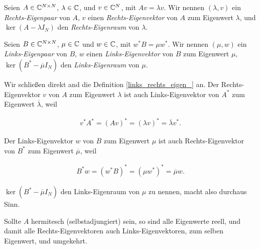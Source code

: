 \begin{definition} \label{links_rechts_eigen_}

    Seien $A \in \mathbb{C}^{N \times N}$, $\lambda \in \mathbb{C}$, und $v \in \mathbb{C}^N$, mit $A v = \lambda v$.
    Wir nennen $(\lambda, v)$ ein \textit{Rechts-Eigenpaar} von $A$, $v$ einen \textit{Rechts-Eigenvektor} von $A$ zum Eigenwert $\lambda$, und $\ker (A - \lambda I_N)$ den \textit{Rechts-Eigenraum} von $\lambda$.

    Seien $B \in \mathbb{C}^{N \times N}$, $\mu \in \mathbb{C}$ und $w \in \mathbb{C}$, mit $w^\ast B = \mu w^\ast$.
    Wir nennen $(\mu, w)$ ein \textit{Links-Eigenpaar} von $B$, $w$ einen \textit{Links-Eigenvektor} von $B$ zum Eigenwert $\mu$, $\ker (B^\ast - \overline \mu I_N)$ den \textit{Links-Eigenraum} von $\mu$.

\end{definition}

\begin{remark}

    Wir schließen direkt and die Definition \ref{links_rechts_eigen_} an.
    Der Rechts-Eigenvektor $v$ von $A$ zum Eigenwert $\lambda$ ist auch Links-Eigenvektor von $A^\ast$ zum Eigenwert $\overline \lambda$, weil

    \begin{align*}
        v^\ast A^\ast
        =
        (A v)^\ast
        =
        (\lambda v)^\ast
        =
        \overline \lambda v^\ast.
    \end{align*}

    Der Links-Eigenvektor $w$ von $B$ zum Eigenwert $\mu$ ist auch Rechts-Eigenvektor von $B^\ast$ zum Eigenwert $\overline \mu$, weil

    \begin{align*}
        B^\ast w
        =
        (w^\ast B)^\ast
        =
        (\mu w^\ast)^\ast
        =
        \overline \mu w.
    \end{align*}

    $\ker (B^\ast - \overline \mu I_N)$ den Links-Eigenraum von $\mu$ zu nennen, macht also durchaus Sinn.

    Sollte $A$ hermitesch (selbstadjungiert) sein, so sind alle Eigenwerte reell, und damit alle Rechts-Eigenvektoren auch Links-Eigenvektoren, zum selben Eigenwert, und umgekehrt.

\end{remark}


